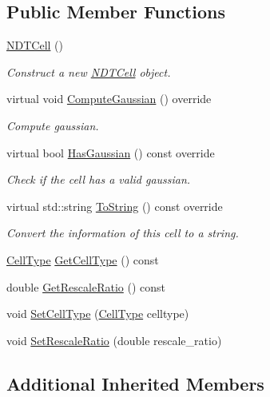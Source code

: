 \subsection*{Public Member Functions}
\begin{DoxyCompactItemize}
\item 
\hyperlink{classNDTCell_acfc90537523f63170f002f74d7db1bd5}{N\+D\+T\+Cell} ()
\begin{DoxyCompactList}\small\item\em Construct a new \hyperlink{classNDTCell}{N\+D\+T\+Cell} object. \end{DoxyCompactList}\item 
virtual void \hyperlink{classNDTCell_a45a92594eb74881f3684c84c4bdfa91e}{Compute\+Gaussian} () override
\begin{DoxyCompactList}\small\item\em Compute gaussian. \end{DoxyCompactList}\item 
virtual bool \hyperlink{classNDTCell_abe1ad036f849e989f9f32f2b7c27530e}{Has\+Gaussian} () const override
\begin{DoxyCompactList}\small\item\em Check if the cell has a valid gaussian. \end{DoxyCompactList}\item 
virtual std\+::string \hyperlink{classNDTCell_ab0243b5d87bfad3884a400681b9c46fa}{To\+String} () const override
\begin{DoxyCompactList}\small\item\em Convert the information of this cell to a string. \end{DoxyCompactList}\item 
\hyperlink{classNDTCell_abd36cc88f0ef7145a126ed0058ea2f6e}{Cell\+Type} \hyperlink{classNDTCell_af70ecb6a8eb56f08de225ab49021bf15}{Get\+Cell\+Type} () const
\item 
double \hyperlink{classNDTCell_a94772575872591b3723e9f19b9e59031}{Get\+Rescale\+Ratio} () const
\item 
void \hyperlink{classNDTCell_a1b01d5830bf808db3809a5a8c2ee7963}{Set\+Cell\+Type} (\hyperlink{classNDTCell_abd36cc88f0ef7145a126ed0058ea2f6e}{Cell\+Type} celltype)
\item 
void \hyperlink{classNDTCell_a9a9a49fa06648269a2c6ac68cd335284}{Set\+Rescale\+Ratio} (double rescale\+\_\+ratio)
\end{DoxyCompactItemize}
\subsection*{Additional Inherited Members}


